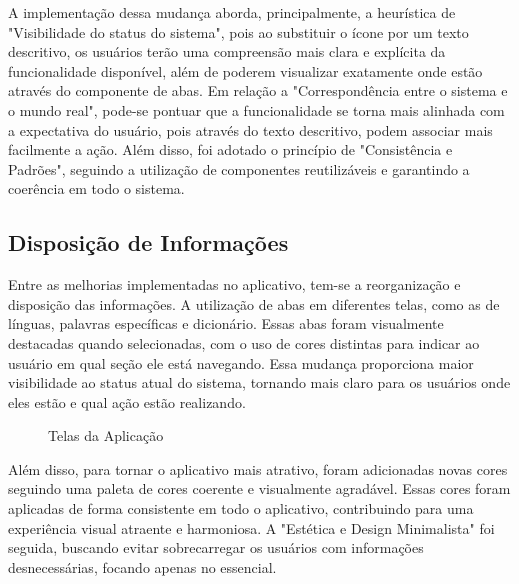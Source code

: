 A implementação dessa mudança aborda, principalmente, a heurística de "Visibilidade do status do sistema", pois ao substituir o ícone por um texto descritivo, os usuários terão uma compreensão mais clara e explícita da 
funcionalidade disponível, além de poderem visualizar exatamente onde estão através do componente de abas. Em relação a "Correspondência entre o sistema e o mundo real", pode-se pontuar que a funcionalidade se torna mais 
alinhada com a expectativa do usuário, pois através do texto descritivo, podem associar mais facilmente a ação. Além disso, foi adotado o princípio de "Consistência e Padrões", seguindo a utilização de componentes 
reutilizáveis e garantindo a coerência em todo o sistema. 

\subsection{Disposição de Informações}
\label{sec:Disposicao de Informacoes}

Entre as melhorias implementadas no aplicativo, tem-se a reorganização e disposição das informações. A utilização de abas em diferentes telas, como as de línguas, palavras específicas e dicionário. Essas abas foram 
visualmente destacadas quando selecionadas, com o uso de cores distintas para indicar ao usuário em qual seção ele está navegando. Essa mudança proporciona maior visibilidade ao status atual do sistema, tornando mais 
claro para os usuários onde eles estão e qual ação estão realizando.

\begin{figure}[h!]
	\centering
	\caption{Telas da Aplicação}
	\label{fig24}
\end{figure}

Além disso, para tornar o aplicativo mais atrativo, foram adicionadas novas cores seguindo uma paleta de cores coerente e visualmente agradável. Essas cores foram aplicadas de forma consistente em todo o aplicativo, 
contribuindo para uma experiência visual atraente e harmoniosa. A "Estética e Design Minimalista" foi seguida, buscando evitar sobrecarregar os usuários com informações desnecessárias, focando apenas no essencial.

